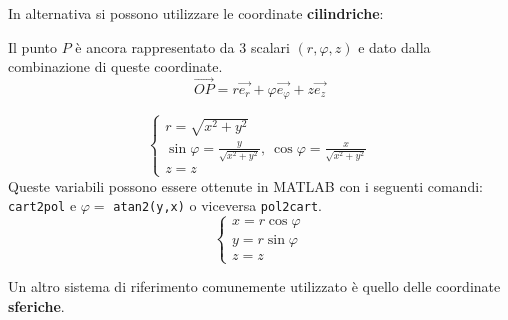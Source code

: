 In alternativa si possono utilizzare le coordinate \textbf{cilindriche}:

\begin{figure}[H] %
\centering
{}
\end{figure}

Il punto $P$ è ancora rappresentato da 3 scalari $(r,\varphi, z)$ e dato dalla combinazione di queste 
coordinate.
$$
\vec{OP} = r\vec{e_r} + \varphi\vec{e_{\varphi}} + z\vec{e_z}
$$

$$
\begin{cases}
r = \sqrt{x^2+y^2}\\
\sin\varphi = \frac{y}{\sqrt{x^2+y^2}},\ \cos\varphi = \frac{x}{\sqrt{x^2+y^2}}\\
z = z
\end{cases}
$$
Queste variabili possono essere ottenute in MATLAB con i seguenti comandi:
\verb|cart2pol| e $\varphi= $ \verb|atan2(y,x)| o viceversa \verb|pol2cart|.
$$
\begin{cases}
x = r\cos\varphi \\
y = r\sin\varphi \\
z = z
\end{cases}
$$

Un altro sistema di riferimento comunemente utilizzato è quello delle coordinate \textbf{sferiche}.

